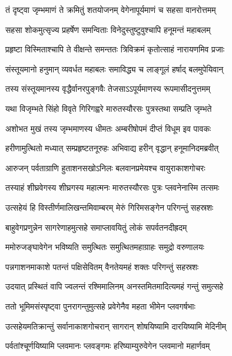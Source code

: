 
\twolineshloka
{तं दृष्ट्वा जृम्भमाणं ते क्रमितुं शतयोजनम्}
{वेगेनापूर्यमाणं च सहसा वानरोत्तमम्} %

\twolineshloka
{सहसा शोकमुत्सृज्य प्रहर्षेण समन्विताः}
{विनेदुस्तुष्टुवुश्चापि हनूमन्तं महाबलम्} %

\twolineshloka
{प्रहृष्टा विस्मिताश्चापि ते वीक्षन्ते समन्ततः}
{त्रिविक्रमं कृतोत्साहं नारायणमिव प्रजाः} %

\twolineshloka
{संस्तूयमानो हनुमान् व्यवर्धत महाबलः}
{समाविद्ध्य च लाङ्गूलं हर्षाद् बलमुपेयिवान्} %

\twolineshloka
{तस्य संस्तूयमानस्य वृद्धैर्वानरपुङ्गवैः}
{तेजसाऽऽपूर्यमाणस्य रूपमासीदनुत्तमम्} %

\twolineshloka
{यथा विजृम्भते सिंहो विवृते गिरिगह्वरे}
{मारुतस्यौरसः पुत्रस्तथा सम्प्रति जृम्भते} %

\twolineshloka
{अशोभत मुखं तस्य जृम्भमाणस्य धीमतः}
{अम्बरीषोपमं दीप्तं विधूम इव पावकः} %

\twolineshloka
{हरीणामुत्थितो मध्यात् सम्प्रहृष्टतनूरुहः}
{अभिवाद्य हरीन् वृद्धान् हनूमानिदमब्रवीत्} %

\twolineshloka
{आरुजन् पर्वताग्राणि हुताशनसखोऽनिलः}
{बलवानप्रमेयश्च वायुराकाशगोचरः} %

\twolineshloka
{तस्याहं शीघ्रवेगस्य शीघ्रगस्य महात्मनः}
{मारुतस्यौरसः पुत्रः प्लवनेनास्मि तत्समः} %

\twolineshloka
{उत्सहेयं हि विस्तीर्णमालिखन्तमिवाम्बरम्}
{मेरुं गिरिमसङ्गेन परिगन्तुं सहस्रशः} %

\twolineshloka
{बाहुवेगप्रणुन्नेन सागरेणाहमुत्सहे}
{समाप्लावयितुं लोकं सपर्वतनदीह्रदम्} %

\twolineshloka
{ममोरुजङ्घावेगेन भविष्यति समुत्थितः}
{समुत्थितमहाग्राहः समुद्रो वरुणालयः} %

\twolineshloka
{पन्नगाशनमाकाशे पतन्तं पक्षिसेवितम्}
{वैनतेयमहं शक्तः परिगन्तुं सहस्रशः} %

\twolineshloka
{उदयात् प्रस्थितं वापि ज्वलन्तं रश्मिमालिनम्}
{अनस्तमितमादित्यमहं गन्तुं समुत्सहे} %

\twolineshloka
{ततो भूमिमसंस्पृष्ट्वा पुनरागन्तुमुत्सहे}
{प्रवेगेनैव महता भीमेन प्लवगर्षभाः} %

\twolineshloka
{उत्सहेयमतिक्रान्तुं सर्वानाकाशगोचरान्}
{सागरान् शोषयिष्यामि दारयिष्यामि मेदिनीम्} %

\twolineshloka
{पर्वतांश्चूर्णयिष्यामि प्लवमानः प्लवङ्गमः}
{हरिष्याम्युरुवेगेन प्लवमानो महार्णवम्} %

